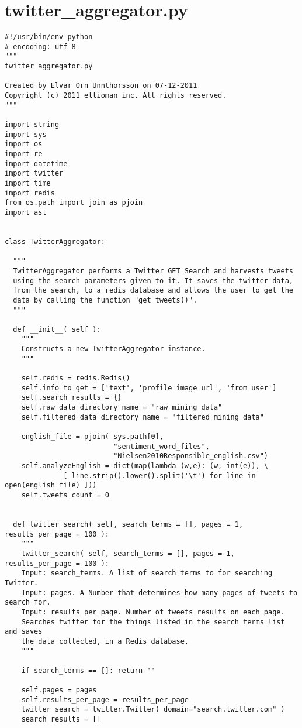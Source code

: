 \section{twitter\_aggregator.py} \label{sec:TwitterAggregator}
\begin{verbatim}
#!/usr/bin/env python
# encoding: utf-8
"""
twitter_aggregator.py

Created by Elvar Orn Unnthorsson on 07-12-2011
Copyright (c) 2011 ellioman inc. All rights reserved.
"""

import string
import sys
import os
import re
import datetime
import twitter
import time
import redis
from os.path import join as pjoin
import ast


class TwitterAggregator:
  
  """
  TwitterAggregator performs a Twitter GET Search and harvests tweets
  using the search parameters given to it. It saves the twitter data,
  from the search, to a redis database and allows the user to get the
  data by calling the function "get_tweets()".
  """
  
  def __init__( self ):
    """
    Constructs a new TwitterAggregator instance.
    """
    
    self.redis = redis.Redis()
    self.info_to_get = ['text', 'profile_image_url', 'from_user']
    self.search_results = {}
    self.raw_data_directory_name = "raw_mining_data"
    self.filtered_data_directory_name = "filtered_mining_data"
    
    english_file = pjoin( sys.path[0], 
                          "sentiment_word_files", 
                          "Nielsen2010Responsible_english.csv")
    self.analyzeEnglish = dict(map(lambda (w,e): (w, int(e)), \
              [ line.strip().lower().split('\t') for line in open(english_file) ]))
    self.tweets_count = 0
  
  
  def twitter_search( self, search_terms = [], pages = 1, results_per_page = 100 ):
    """
    twitter_search( self, search_terms = [], pages = 1, results_per_page = 100 ):
    Input: search_terms. A list of search terms to for searching Twitter.
    Input: pages. A Number that determines how many pages of tweets to search for.
    Input: results_per_page. Number of tweets results on each page.
    Searches twitter for the things listed in the search_terms list and saves 
    the data collected, in a Redis database.
    """
    
    if search_terms == []: return ''
    
    self.pages = pages
    self.results_per_page = results_per_page
    twitter_search = twitter.Twitter( domain="search.twitter.com" )
    search_results = []
    

\end{verbatim}
